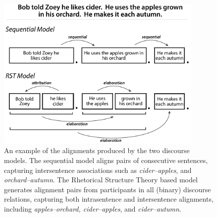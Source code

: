 %
%
%
%
%


\begin{figure}[t!]
\begin{center}
\includegraphics[width=100mm]{mainmatter/naacl2015-alignment/rst2a.pdf}
\caption{{\small An example of the alignments produced by the two discourse models.  The sequential model aligns pairs of consecutive sentences, capturing intersentence associations such as \emph{cider--apples}, and \emph{orchard--autumn}.  The Rhetorical Structure Theory based model generates alignment pairs from participants in all (binary) discourse relations, capturing both intrasentence and intersentence alignments, including 
\emph{apples--orchard, cider--apples}, and \emph{cider--autumn}.}}
\label{fig:examples}
\end{center}
\end{figure}

